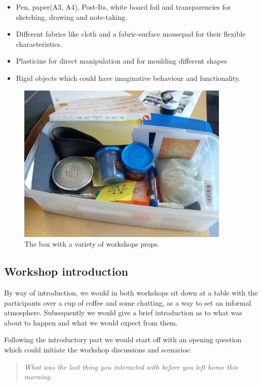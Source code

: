 \begin{itemize}
  \item{Pen, paper(A3, A4), Post-Its, white board foil and transparencies for sketching, drawing and note-taking.}
  \item{Different fabrics like cloth and a fabric-surface mousepad for their flexible characteristics.}
  \item{Plasticine for direct manipulation and for moulding different shapes}
  \item{Rigid objects which could have imaginative behaviour and functionality.}
\end{itemize}

\begin{figure}[hb]
  \centering
    \includegraphics[width=4in]{workshops/props-box}
    \caption[A box with a variety of workshops props.] %
  {The box with a variety of workshops props.} %
  \label{ch:workshops:props-box}
\end{figure}

\subsection{Workshop introduction}

By way of introduction, we would in both workshops sit down at a table with the participants over a cup of coffee and some chatting, as a way to set an informal atmosphere.
Subsequently we would give a brief introduction as to what was about to happen and what we would expect from them.

Following the introductory part we would start off with an opening question which could initiate the workshop discussions and scenarios:

\begin{quotation}
  \em What was the last thing you interacted with before you left home this morning.
\end{quotation}

